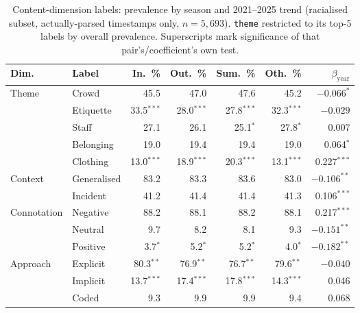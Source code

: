 \begin{table}[htbp]
\centering
\footnotesize
\setlength{\tabcolsep}{3pt}
\caption{Content-dimension labels: prevalence by season and 2021--2025 trend (racialised subset, actually-parsed timestamps only, $n=5{,}693$). \texttt{theme} restricted to its top-5 labels by overall prevalence. Superscripts mark significance of that pair's/coefficient's own test.}
\label{tab:dimension-season-trend}
\begin{tabular}{@{} l l r r r r r @{}}
\toprule
Dim. & Label & In.\ \% & Out.\ \% & Sum.\ \% & Oth.\ \% & $\beta_{\text{year}}$ \\
\midrule
Theme & Crowd & 45.5 & 47.0 & 47.6 & 45.2 & $-0.066^{*}$ \\
& Etiquette & 33.5$^{***}$ & 28.0$^{***}$ & 27.8$^{***}$ & 32.3$^{***}$ & $-0.029$ \\
& Staff & 27.1 & 26.1 & 25.1$^{*}$ & 27.8$^{*}$ & \phantom{-}0.007 \\
& Belonging & 19.0 & 19.4 & 19.4 & 19.0 & \phantom{-}0.064$^{*}$ \\
& Clothing & 13.0$^{***}$ & 18.9$^{***}$ & 20.3$^{***}$ & 13.1$^{***}$ & \phantom{-}0.227$^{***}$ \\
\midrule
Context & Generalised & 83.2 & 83.3 & 83.6 & 83.0 & $-0.106^{**}$ \\
& Incident & 41.2 & 41.4 & 41.4 & 41.3 & \phantom{-}0.106$^{***}$ \\
\midrule
Connotation & Negative & 88.2 & 88.1 & 88.2 & 88.1 & \phantom{-}0.217$^{***}$ \\
& Neutral & 9.7 & 8.2 & 8.1 & 9.3 & $-0.151^{**}$ \\
& Positive & 3.7$^{*}$ & 5.2$^{*}$ & 5.2$^{*}$ & 4.0$^{*}$ & $-0.182^{**}$ \\
\midrule
Approach & Explicit & 80.3$^{**}$ & 76.9$^{**}$ & 76.7$^{**}$ & 79.6$^{**}$ & $-0.040$ \\
& Implicit & 13.7$^{***}$ & 17.4$^{***}$ & 17.8$^{***}$ & 14.3$^{***}$ & \phantom{-}0.046 \\
& Coded & 9.3 & 9.9 & 9.9 & 9.4 & \phantom{-}0.068 \\
\bottomrule
\end{tabular}


\end{table}
